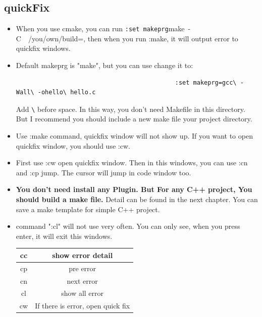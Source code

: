 \documentclass[paper=8.5in:11in, twoside, 12pt, pagesize=pdftex]{book}
\begin{document}
									\subsection{quickFix}
									\begin{itemize}
										\item When you use cmake, you can run \verb=:set makeprg=make\ -C\ ~/you/own/build=, then when you run :make, it will output error to quickfix windows.
										
										
										\item Default makeprg is "make", but you can use change it to: 
										
										\begin{verbatim}
											:set makeprg=gcc\ -Wall\ -ohello\ hello.c 
										\end{verbatim}
										Add \verb=\= before space. In this way, you don't need Makefile in this directory. But I recommend you should include a new make file your project directory.
										
										\item Use :make command, quickfix window will not show up. If you want to open quickfix window, you should use :cw. 
										
										\item First use :cw open quickfix window. Then in this windows, you can use :cn and :cp jump. The cursor will jump in code window  too. 
										
										\item \textbf{You don't need install any Plugin. But For any C++ project, You should build a make file.} Detail can be found in the next chapter.  You can save a make template for simple C++ project. 
										
										\item command ":cl" will not use very often. You can only see, when you press enter, it will exit this windows. 
										
										\begin{tabular}{c|c}
											\hline
											cc  &    show error detail \\
											\hline
											cp  &     pre error \\ 
											\hline
											cn &   next error\\ 
											\hline
											cl &     show all error\\
											\hline
											cw &    If there is error, open quick fix \\ 
										\end{tabular}
										
									\end{itemize}
									
\end{document}
